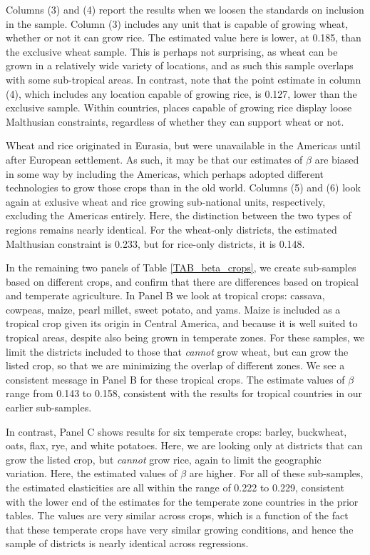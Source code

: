 \documentclass[11pt]{article}
\begin{document}
Columns (3) and (4) report the results when we loosen the standards on inclusion in the sample. Column (3) includes any unit that is capable of growing wheat, whether or not it can grow rice. The estimated value here is lower, at 0.185, than the exclusive wheat sample. This is perhaps not surprising, as wheat can be grown in a relatively wide variety of locations, and as such this sample overlaps with some sub-tropical areas. In contrast, note that the point estimate in column (4), which includes any location capable of growing rice, is 0.127, lower than the exclusive sample. Within countries, places capable of growing rice display loose Malthusian constraints, regardless of whether they can support wheat or not.

Wheat and rice originated in Eurasia, but were unavailable in the Americas until after European settlement. As such, it may be that our estimates of $\beta$ are biased in some way by including the Americas, which perhaps adopted different technologies to grow those crops than in the old world. Columns (5) and (6) look again at exlusive wheat and rice growing sub-national units, respectively, excluding the Americas entirely. Here, the distinction between the two types of regions remains nearly identical. For the wheat-only districts, the estimated Malthusian constraint is 0.233, but for rice-only districts, it is 0.148. 

In the remaining two panels of Table \ref{TAB_beta_crops}, we create sub-samples based on different crops, and confirm that there are differences based on tropical and temperate agriculture. In Panel B we look at tropical crops: cassava, cowpeas, maize, pearl millet, sweet potato, and yams. Maize is included as a tropical crop given its origin in Central America, and because it is well suited to tropical areas, despite also being grown in temperate zones. For these samples, we limit the districts included to those that \textit{cannot} grow wheat, but can grow the listed crop, so that we are minimizing the overlap of different zones. We see a consistent message in Panel B for these tropical crops. The estimate values of $\beta$ range from 0.143 to 0.158, consistent with the results for tropical countries in our earlier sub-samples.

In contrast, Panel C shows results for six temperate crops: barley, buckwheat, oats, flax, rye, and white potatoes. Here, we are looking only at districts that can grow the listed crop, but \textit{cannot} grow rice, again to limit the geographic variation. Here, the estimated values of $\beta$ are higher. For all of these sub-samples, the estimated elasticities are all within the range of 0.222 to 0.229, consistent with the lower end of the estimates for the temperate zone countries in the prior tables. The values are very similar across crops, which is a function of the fact that these temperate crops have very similar growing conditions, and hence the sample of districts is nearly identical across regressions. 
\end{document}

